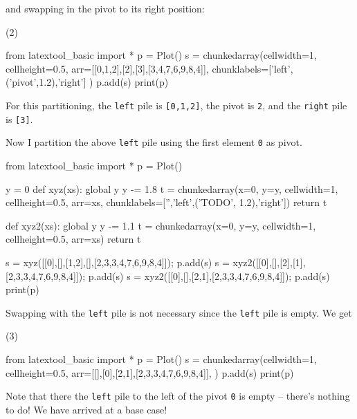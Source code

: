 and swapping in the pivot to its right position:
\begin{center}
(2)
\end{center}
{\small
\begin{python}
from latextool_basic import *
p = Plot()
s = chunkedarray(cellwidth=1, 
                   cellheight=0.5,
                   arr=[[0,1,2],[2],[3],[3,4,7,6,9,8,4]],
                   chunklabels=['left',('pivot',1.2),'right']
)
p.add(s)
print(p)
\end{python}
}
For this partitioning, 
the \verb!left! pile is \verb![0,1,2]!, the pivot is \verb!2!, and
the \verb!right! pile is \verb![3]!.

Now I partition the above \verb!left! pile using the first element
\verb!0! as pivot.
{\small
\begin{python}
from latextool_basic import *
p = Plot()

y = 0
def xyz(xs):
    global y
    y -= 1.8
    t = chunkedarray(x=0, y=y,
                        cellwidth=1, 
                        cellheight=0.5,
                        arr=xs,
                        chunklabels=['','left',('TODO', 1.2),'right'])
    return t

def xyz2(xs):
    global y
    y -= 1.1
    t = chunkedarray(x=0, y=y,
                        cellwidth=1, 
                        cellheight=0.5,
                        arr=xs)
    return t

s = xyz([[0],[],[1,2],[],[2,3,3,4,7,6,9,8,4]]); p.add(s)
s = xyz2([[0],[],[2],[1],[2,3,3,4,7,6,9,8,4]]); p.add(s)
s = xyz2([[0],[],[2,1],[2,3,3,4,7,6,9,8,4]]); p.add(s)
print(p)
\end{python}
}
Swapping with the \verb!left! pile is not necessary since the 
\verb!left! pile is empty.
We get
\begin{center}
(3)
\end{center}
\begin{python}
from latextool_basic import *
p = Plot()
s = chunkedarray(cellwidth=1,
                   cellheight=0.5,
                   arr=[[],[0],[2,1],[2,3,3,4,7,6,9,8,4]],
)
p.add(s)
print(p)
\end{python}
Note that there the \verb!left! pile to the left of the pivot \verb!0!
is empty -- there's nothing to do!
We have arrived at a base case!

